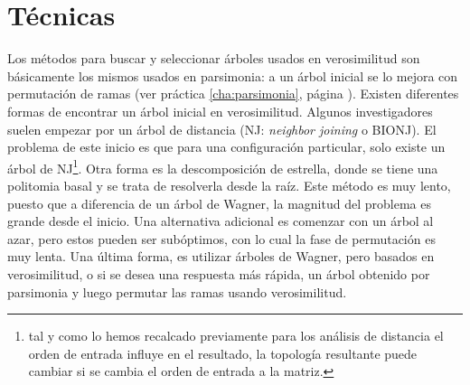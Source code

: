 \section*{T\'ecnicas}
Los m\'etodos para buscar y seleccionar \'arboles usados en verosimilitud son b\'asicamente los mismos usados en parsimonia: a un \'arbol inicial se lo mejora con permutaci\'on de ramas (ver pr\'actica \ref{cha:parsimonia}, p\'agina \pageref{cha:parsimonia}). Existen diferentes formas de encontrar un \'arbol inicial en verosimilitud. Algunos investigadores suelen empezar por un \'arbol de distancia (NJ: {{\textit{neighbor joining}}} o BIONJ). El problema de este inicio es que para una configuraci\'on particular, solo existe un \'arbol de NJ\footnote{tal y como lo hemos recalcado previamente para los an\'alisis de distancia el orden de entrada influye en el resultado, la topolog\'ia resultante puede cambiar si se cambia el orden de entrada a la matriz.}. Otra forma es la descomposici\'on de estrella, donde se tiene una politomia basal y se trata de resolverla desde la ra\'iz. Este m\'etodo es muy lento, puesto que a diferencia de un \'arbol de Wagner, la magnitud del problema es grande desde el inicio. Una alternativa adicional es comenzar con un \'arbol al azar, pero estos pueden ser sub\'optimos, con lo cual la fase de permutaci\'on es muy lenta. Una \'ultima forma, es utilizar \'arboles de Wagner, pero basados en verosimilitud, o si se desea una respuesta m\'as r\'apida, un \'arbol obtenido por parsimonia y luego permutar las ramas usando verosimilitud.

